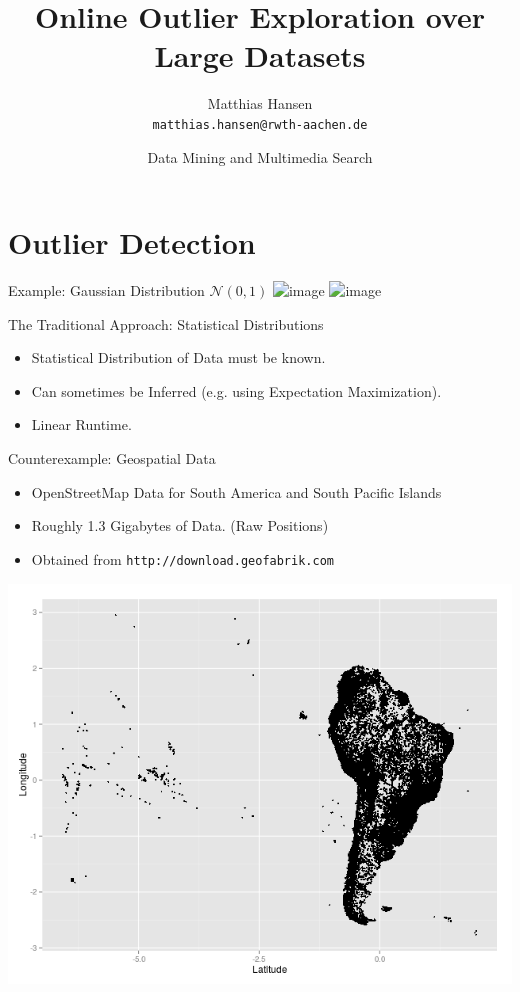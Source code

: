 \documentclass{beamer}
\title{Online Outlier Exploration over Large Datasets}
\author{Matthias Hansen \\
        \texttt{matthias.hansen@rwth-aachen.de}}
\date{Data Mining and Multimedia Search}
\institute{RWTH Aachen University}
\begin{document}
\frame{\titlepage}
\section{Outlier Detection}



\begin{frame}{Example: Gaussian Distribution $\mathcal{N}(0,1)$}
    \centering
    \includegraphics<1>[width=.7\textwidth]{images/gaussian.png}
    \includegraphics<2>[width=.7\textwidth]{images/gaussian_lines.png}

\end{frame}

\begin{frame}{The Traditional Approach: Statistical Distributions}
    \begin{itemize}
        \item Statistical Distribution of Data must be known.
        \item Can sometimes be Inferred (e.g. using Expectation Maximization).
        \item Linear Runtime.
    \end{itemize}
\end{frame}

\begin{frame}{Counterexample: Geospatial Data}
    \begin{itemize}
        \item OpenStreetMap Data for South America and South Pacific Islands

        \item Roughly 1.3 Gigabytes of Data. (Raw Positions)

        \item Obtained from \texttt{http://download.geofabrik.com}
    \end{itemize}
    \begin{center}
    \includegraphics[width=.7\textwidth]{images/south_america.png} 
    \end{center}
\end{frame}
\end{document}
